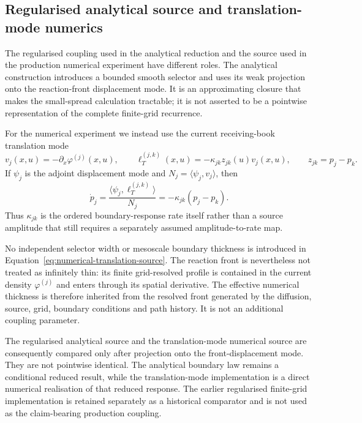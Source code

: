 
\subsection{Regularised analytical source and translation-mode numerics}
\label{app:translation-mode-numerics}

The regularised coupling used in the analytical reduction and the source used
in the production numerical experiment have different roles.  The analytical
construction introduces a bounded smooth selector and uses its weak projection
onto the reaction-front displacement mode.  It is an approximating closure
that makes the small-spread calculation tractable; it is not asserted to be a
pointwise representation of the complete finite-grid recurrence.

For the numerical experiment we instead use the current receiving-book
translation mode
\begin{equation}
  v_j(x,u)=-\partial_x\varphi^{(j)}(x,u),
  \qquad
  \ell_T^{(j,k)}(x,u)
  =-\kappa_{jk}z_{jk}(u)v_j(x,u),
  \qquad
  z_{jk}=p_j-p_k.
  \label{eq:numerical-translation-source}
\end{equation}
If $\psi_j$ is the adjoint displacement mode and
$N_j=\langle\psi_j,v_j\rangle$, then
\begin{equation}
  \dot p_j
  =\frac{\langle\psi_j,\ell_T^{(j,k)}\rangle}{N_j}
  =-\kappa_{jk}(p_j-p_k).
  \label{eq:numerical-projected-boundary-law}
\end{equation}
Thus $\kappa_{jk}$ is the ordered boundary-response rate itself rather than a
source amplitude that still requires a separately assumed amplitude-to-rate
map.

No independent selector width or mesoscale boundary thickness is introduced
in Equation~\eqref{eq:numerical-translation-source}.  The reaction front is
nevertheless not treated as infinitely thin: its finite grid-resolved profile
is contained in the current density $\varphi^{(j)}$ and enters through its
spatial derivative.  The effective numerical thickness is therefore inherited
from the resolved front generated by the diffusion, source, grid, boundary
conditions and path history.  It is not an additional coupling parameter.

The regularised analytical source and the translation-mode numerical source
are consequently compared only after projection onto the front-displacement
mode.  They are not pointwise identical.  The analytical boundary law remains
a conditional reduced result, while the translation-mode implementation is a
direct numerical realisation of that reduced response.  The earlier
regularised finite-grid implementation is retained separately as a historical
comparator and is not used as the claim-bearing production coupling.
